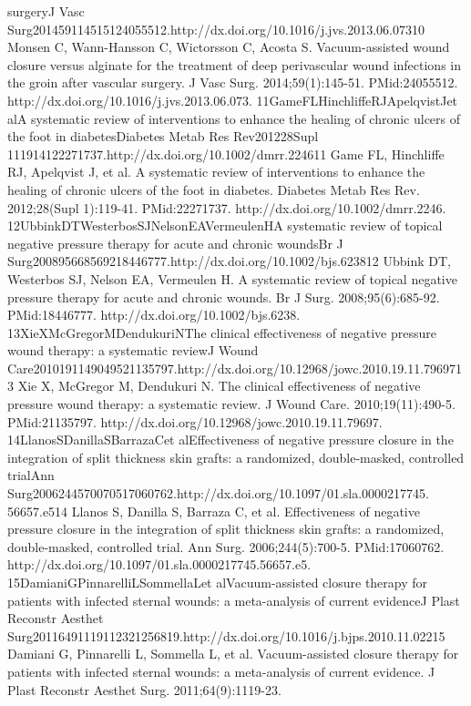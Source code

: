 \documentclass[numberinsection,times,10pt,spreadimages]{memoir}
\begin{document}
surgeryJ Vasc
Surg201459114515124055512.http://dx.doi.org/10.1016/j.jvs.2013.06.07310 Monsen
C, Wann-Hansson C, Wictorsson C, Acosta S. Vacuum-assisted
wound closure versus alginate for the treatment of deep perivascular wound
infections in the groin after vascular surgery. J Vasc Surg. 2014;59(1):145-51.
PMid:24055512. http://dx.doi.org/10.1016/j.jvs.2013.06.073.
11GameFLHinchliffeRJApelqvistJet alA systematic review of interventions to
enhance the healing of
chronic ulcers of the foot in diabetesDiabetes Metab Res Rev201228Supl
111914122271737.http://dx.doi.org/10.1002/dmrr.224611 Game FL, Hinchliffe RJ,
Apelqvist J, et al. A systematic review
of interventions to enhance the healing of chronic ulcers of the foot in
diabetes. Diabetes Metab Res Rev. 2012;28(Supl 1):119-41. PMid:22271737.
http://dx.doi.org/10.1002/dmrr.2246. 12UbbinkDTWesterbosSJNelsonEAVermeulenHA
systematic review of topical negative pressure therapy for
acute and chronic woundsBr J
Surg200895668569218446777.http://dx.doi.org/10.1002/bjs.623812 Ubbink DT,
Westerbos SJ, Nelson EA, Vermeulen H. A systematic
review of topical negative pressure therapy for acute and chronic wounds. Br J
Surg. 2008;95(6):685-92. PMid:18446777. http://dx.doi.org/10.1002/bjs.6238.
13XieXMcGregorMDendukuriNThe clinical effectiveness of negative pressure wound
therapy: a
systematic reviewJ Wound
Care2010191149049521135797.http://dx.doi.org/10.12968/jowc.2010.19.11.7969713
Xie X, McGregor M, Dendukuri N. The clinical effectiveness of
negative pressure wound therapy: a systematic review. J Wound Care.
2010;19(11):490-5. PMid:21135797.
http://dx.doi.org/10.12968/jowc.2010.19.11.79697.
14LlanosSDanillaSBarrazaCet alEffectiveness of negative pressure closure in the
integration of
split thickness skin grafts: a randomized, double-masked, controlled
trialAnn Surg2006244570070517060762.http://dx.doi.org/10.1097/01.sla.0000217745.
56657.e514 Llanos S, Danilla S, Barraza C, et al. Effectiveness of negative
pressure closure in the integration of split thickness skin grafts: a
randomized, double-masked, controlled trial. Ann Surg. 2006;244(5):700-5.
PMid:17060762. http://dx.doi.org/10.1097/01.sla.0000217745.56657.e5.
15DamianiGPinnarelliLSommellaLet alVacuum-assisted closure therapy for patients
with infected
sternal wounds: a meta-analysis of current evidenceJ Plast Reconstr Aesthet
Surg20116491119112321256819.http://dx.doi.org/10.1016/j.bjps.2010.11.02215
Damiani G, Pinnarelli L, Sommella L, et al. Vacuum-assisted
closure therapy for patients with infected sternal wounds: a meta-analysis of
current evidence. J Plast Reconstr Aesthet Surg. 2011;64(9):1119-23.
\end{document}
